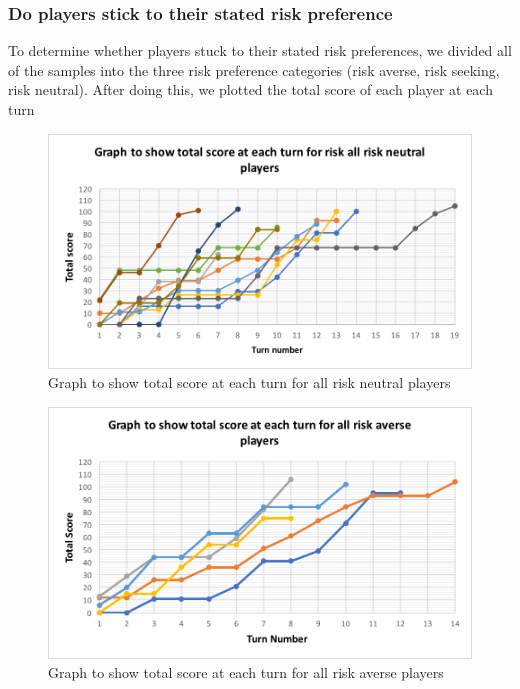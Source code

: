 \documentclass[a4paper,titlepage]{article}
\begin{document}
\subsubsection{Do players stick to their stated risk preference}
To determine whether players stuck to their stated risk preferences, we divided all of the samples into the three risk preference categories (risk averse, risk seeking, risk neutral). After doing this, we plotted the total score of each player at each turn
\begin{figure}
\center
\includegraphics[scale=1]{neutral_graph}
\caption{Graph to show total score at each turn for all risk neutral players\label{figure7}}
\end{figure}
\begin{figure}
\center
\includegraphics[scale=1]{averse_graph}
\caption{Graph to show total score at each turn for all risk averse players\label{figure8}}
\end{figure}
\end{document}
